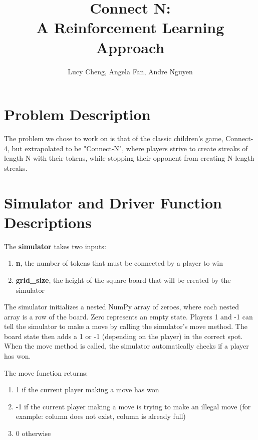 \documentclass[12pt]{article}
\newcommand*{\TitleFont}{%
      \usefont{\encodingdefault}{\rmdefault}{n}{b}%
      \fontsize{14}{16}%
      \selectfont}
\begin{document}
\title{\TitleFont \textbf{Connect N:\\ A Reinforcement Learning Approach}}
\author{\TitleFont Lucy Cheng, Angela Fan, Andre Nguyen}
\date{}
\maketitle

\vspace{-1.5cm}

\section{Problem Description}

The problem we chose to work on is that of the classic children's game, Connect-4, but extrapolated to be "Connect-N", where players strive to create streaks of length N with their tokens, while stopping their opponent from creating N-length streaks.

\section{Simulator and Driver Function Descriptions}

The \textbf{simulator} takes two inputs:
\begin{enumerate}
\item \textbf{n}, the number of tokens that must be connected by a player to win
\item \textbf{grid\_size}, the height of the square board that will be created by the simulator
\end{enumerate}

The simulator initializes a nested NumPy array of zeroes, where each nested array is a row of the board. Zero represents an empty state. Players 1 and -1 can tell the simulator to make a move by calling the simulator's move method. The board state then adds a 1 or -1 (depending on the player) in the correct spot. When the move method is called, the simulator automatically checks if a player has won. 

The move function returns:

\begin{enumerate}
\item 1 if the current player making a move has won
\item -1 if the current player making a move is trying to make an illegal move (for example: column does not exist, column is already full)
\item 0 otherwise
\end{enumerate}
\end{document}
